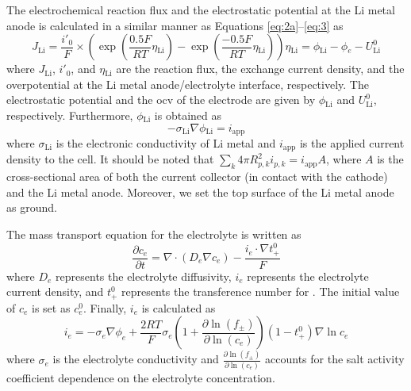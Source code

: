 \documentclass{article}
\begin{document}
The electrochemical reaction flux and the electrostatic potential at
the Li metal anode is calculated in a similar manner as Equations
\ref{eq:2a}--\ref{eq:3} as\cite{dasgupta2016}
\begin{subequations}
\begin{equation}
  J_{\mathrm{Li}}=\frac{i'_0}{F}\times \left(\exp\left(\frac{0.5F}{RT}\eta{}_{\mathrm{Li}}\right)-\exp\left(\frac{-0.5F}{RT}\eta{}_{\mathrm{Li}}\right)\right)
  \label{eq:4a}
\end{equation}
\begin{equation}
  \eta{}_{\mathrm{Li}}=\phi{}_{\mathrm{Li}}-\phi{}_e-U_{\mathrm{Li}}^0
  \label{eq:4b}
\end{equation}
\end{subequations}
where $J_{\mathrm{Li}}$, $i'_0$, and $\eta{}_{\mathrm{Li}}$ are the
reaction flux, the exchange current density, and the overpotential at
the Li metal anode/electrolyte interface, respectively. The
electrostatic potential and the \gls{ocv} of the electrode are given
by $\phi{}_{\mathrm{Li}}$ and $U_{\mathrm{Li}}^0$,
respectively. Furthermore, $\phi{}_{\mathrm{Li}}$ is obtained
as\cite{newman1993,newman1994}
\begin{equation}
  -\sigma{}_{\mathrm{Li}}\nabla{}\phi{}_{\mathrm{Li}}=i_{\mathrm{app}}
  \label{eq:5}
\end{equation}
where $\sigma{}_{\mathrm{Li}}$ is the electronic conductivity of Li
metal and $i_{\mathrm{app}}$ is the applied current density to the
cell. It should be noted that $\sum_k4\pi
R_{p,k}^2i_{p,k}=i_{\mathrm{app}}A$, where $A$ is the cross-sectional
area of both the current collector (in contact with the \nca{}
cathode) and the Li metal anode. Moreover, we set the top surface of
the Li metal anode as ground.

The mass transport equation for the electrolyte is written as\cite{newman1993,newman1994}
\begin{equation}
  \frac{\partial c_e}{\partial t} = \nabla \cdot \left(D_e \nabla c_e \right) - \frac{i_e\cdot\nabla{}t_{+}^0}{F}
  \label{eq:6}
\end{equation}
where $D_e$ represents the electrolyte diffusivity, $i_e$ represents
the electrolyte current density, and $t_+^0$ represents the
transference number for . The initial value of $c_e$ is set
as $c_e^0$. Finally, $i_e$ is calculated
as\cite{newman1993,newman1994}
\begin{equation}
  i_e=-\sigma_e\nabla \phi _e+\frac{2RT}{F}\sigma_e\left(1+\frac{\partial \ln \left(f_{\pm}\right)}{\partial \ln \left(c_e\right)}\right)\left(1-t_+^0\right)\nabla \ln c_e
  \label{eq:7}
\end{equation}
where $\sigma_e$ is the electrolyte conductivity and $\frac{\partial
  \ln \left(f_\pm\right)}{\partial \ln \left(c_e\right)}$ accounts for
the salt activity coefficient dependence on the electrolyte
concentration.
\end{document}
